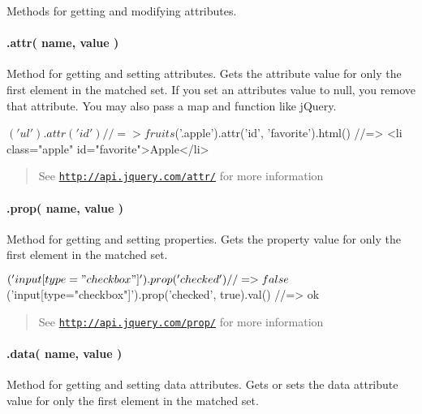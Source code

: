 Methods for getting and modifying attributes.

\paragraph*{.attr( name, value )}

Method for getting and setting attributes. Gets the attribute value for only the first element in the matched set. If you set an attribute\textquotesingle{}s value to {\ttfamily null}, you remove that attribute. You may also pass a {\ttfamily map} and {\ttfamily function} like j\+Query.


\begin{DoxyCode}
$('ul').attr('id')
//=> fruits

$('.apple').attr('id', 'favorite').html()
//=> <li class="apple" id="favorite">Apple</li>
\end{DoxyCode}


\begin{quote}
See \href{http://api.jquery.com/attr/}{\tt http\+://api.\+jquery.\+com/attr/} for more information \end{quote}


\paragraph*{.prop( name, value )}

Method for getting and setting properties. Gets the property value for only the first element in the matched set.


\begin{DoxyCode}
$('input[type="checkbox"]').prop('checked')
//=> false

$('input[type="checkbox"]').prop('checked', true).val()
//=> ok
\end{DoxyCode}


\begin{quote}
See \href{http://api.jquery.com/prop/}{\tt http\+://api.\+jquery.\+com/prop/} for more information \end{quote}


\paragraph*{.data( name, value )}

Method for getting and setting data attributes. Gets or sets the data attribute value for only the first element in the matched set.




